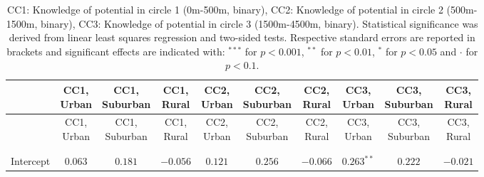 
\begin{center}
\begin{small}
\begin{longtable}{l@{} c@{} c@{} c@{} c@{} c@{} c@{} c@{} c@{} c@{}}
\hline
 & \shortstack{\rule{0pt}{2.2ex}CC1,\\Urban} & \shortstack{\rule{0pt}{2.2ex}CC1,\\Suburban} & \shortstack{\rule{0pt}{2.2ex}CC1,\\Rural} & \shortstack{\rule{0pt}{2.2ex}CC2,\\Urban} & \shortstack{\rule{0pt}{2.2ex}CC2,\\Suburban} & \shortstack{\rule{0pt}{2.2ex}CC2,\\Rural} & \shortstack{\rule{0pt}{2.2ex}CC3,\\Urban} & \shortstack{\rule{0pt}{2.2ex}CC3,\\Suburban} & \shortstack{\rule{0pt}{2.2ex}CC3,\\Rural} \\
\hline
\endfirsthead
\hline
 & \shortstack{\rule{0pt}{2.2ex}CC1,\\Urban} & \shortstack{\rule{0pt}{2.2ex}CC1,\\Suburban} & \shortstack{\rule{0pt}{2.2ex}CC1,\\Rural} & \shortstack{\rule{0pt}{2.2ex}CC2,\\Urban} & \shortstack{\rule{0pt}{2.2ex}CC2,\\Suburban} & \shortstack{\rule{0pt}{2.2ex}CC2,\\Rural} & \shortstack{\rule{0pt}{2.2ex}CC3,\\Urban} & \shortstack{\rule{0pt}{2.2ex}CC3,\\Suburban} & \shortstack{\rule{0pt}{2.2ex}CC3,\\Rural} \\
\hline
\endhead
\hline
\endfoot
\hline
\multicolumn{10}{l}{\tiny{
}}\\
\caption{CC1: Knowledge of potential in circle 1 (0m-500m, binary), CC2: Knowledge of potential in circle 2 (500m-1500m, binary), CC3: Knowledge of potential in circle 3 (1500m-4500m, binary). Statistical significance was derived from linear least squares regression and two-sided tests. Respective standard errors are reported in brackets and significant effects are indicated with: $^{***}$ for $p < 0.001$, $^{**}$ for $p < 0.01$, $^*$ for $p < 0.05$ and $\cdot$ for $p < 0.1$.}
\label{table:coefficients}
\endlastfoot \\
Intercept                           & $0.063$         & $0.181$          & $-0.056$     & $0.121$         & $0.256$          & $-0.066$         & $0.263^{**}$    & $0.222$         & $-0.021$        \\

\end{longtable}
\end{small}
\end{center}
